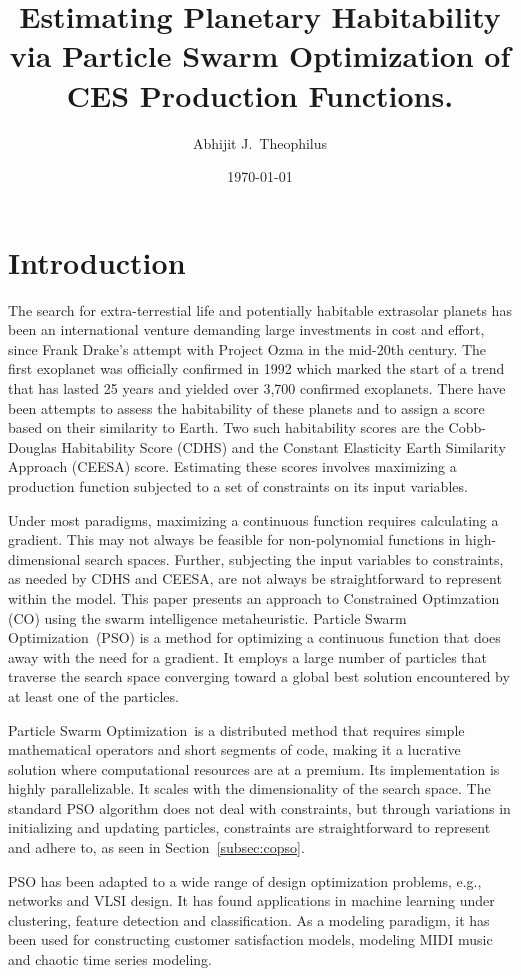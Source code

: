 \documentclass[10pt]{article}
\title{Estimating Planetary Habitability via Particle Swarm Optimization of CES Production Functions.}
\author{Abhijit J.\ Theophilus}
\date{\today}
\newcommand{\pso}{Particle Swarm Optimization}
\begin{document}
\maketitle


\section{Introduction}\label{sec:intro}
The search for extra-terrestial life and potentially habitable extrasolar planets has been an international venture
demanding large investments in cost and effort, since Frank Drake's attempt with Project Ozma in the mid-20th century.
The first exoplanet was officially confirmed in 1992 which marked the start of a trend that has lasted 25 years and
yielded over 3,700 confirmed exoplanets. There have been attempts to assess the habitability of these planets and to
assign a score based on their similarity to Earth. Two such habitability scores are the Cobb-Douglas Habitability Score
(CDHS) and the Constant Elasticity Earth Similarity Approach (CEESA) score. Estimating these scores involves maximizing
a production function subjected to a set of constraints on its input variables.

Under most paradigms, maximizing a continuous function requires calculating a gradient. This may not always be feasible
for non-polynomial functions in high-dimensional search spaces. Further, subjecting the input variables to constraints,
as needed by CDHS and CEESA, are not always be straightforward to represent within the model. This paper presents an
approach to Constrained Optimzation (CO) using the swarm intelligence metaheuristic. \pso\ (PSO) is a method for
optimizing a continuous function that does away with the need for a gradient. It employs a large number of particles
that traverse the search space converging toward a global best solution encountered by at least one of the particles.

\pso\ is a distributed method that requires simple mathematical operators and short segments of code, making it a
lucrative solution where computational resources are at a premium. Its implementation is highly parallelizable. It
scales with the dimensionality of the search space. The standard PSO algorithm does not deal with constraints, but
through variations in initializing and updating particles, constraints are straightforward to represent and adhere to,
as seen in Section~\ref{subsec:copso}.

PSO has been adapted to a wide range of design optimization problems, e.g., networks and VLSI design. It has found
applications in machine learning under clustering, feature detection and classification. As a modeling paradigm, it has
been used for constructing customer satisfaction models, modeling MIDI music and chaotic time series modeling.
\end{document}
